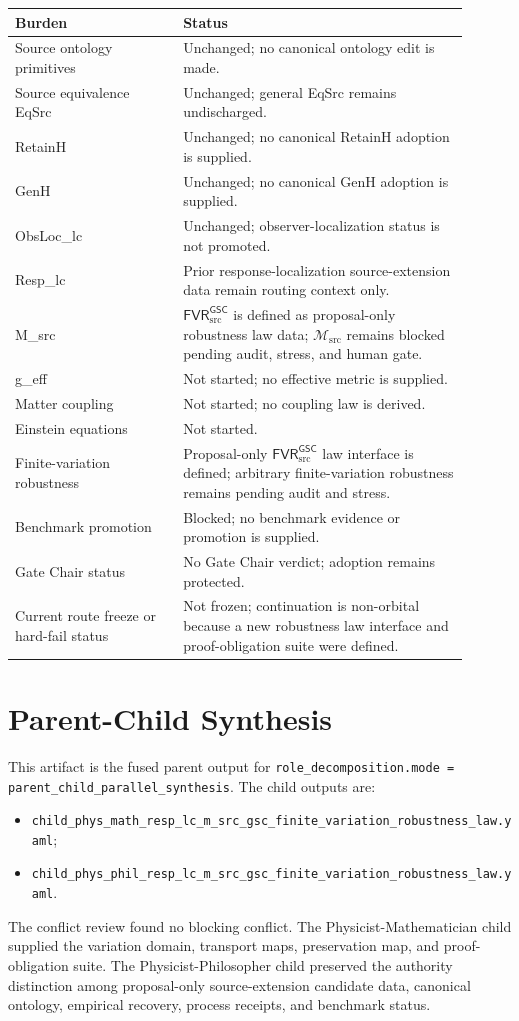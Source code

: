 \documentclass[11pt]{article}
\newcommand{\Msrc}{\mathcal{M}_{\mathrm{src}}}
\newcommand{\FVR}{\mathsf{FVR}_{\mathrm{src}}^{\mathsf{GSC}}}
\begin{document}
\begin{center}
\begin{tabular}{p{0.33\linewidth}p{0.57\linewidth}}
\hline
Burden & Status \\
\hline
Source ontology primitives & Unchanged; no canonical ontology edit is made. \\
Source equivalence EqSrc & Unchanged; general EqSrc remains undischarged. \\
RetainH & Unchanged; no canonical RetainH adoption is supplied. \\
GenH & Unchanged; no canonical GenH adoption is supplied. \\
ObsLoc\_lc & Unchanged; observer-localization status is not promoted. \\
Resp\_lc & Prior response-localization source-extension data remain routing context only. \\
M\_src & \(\FVR\) is defined as proposal-only robustness law data; \(\Msrc\) remains blocked pending audit, stress, and human gate. \\
g\_eff & Not started; no effective metric is supplied. \\
Matter coupling & Not started; no coupling law is derived. \\
Einstein equations & Not started. \\
Finite-variation robustness & Proposal-only \(\FVR\) law interface is defined; arbitrary finite-variation robustness remains pending audit and stress. \\
Benchmark promotion & Blocked; no benchmark evidence or promotion is supplied. \\
Gate Chair status & No Gate Chair verdict; adoption remains protected. \\
Current route freeze or hard-fail status & Not frozen; continuation is non-orbital because a new robustness law interface and proof-obligation suite were defined. \\
\hline
\end{tabular}
\end{center}

\section{Parent-Child Synthesis}

This artifact is the fused parent output for
\texttt{role\_decomposition.mode = parent\_child\_parallel\_synthesis}. The
child outputs are:
\begin{itemize}
  \item \texttt{child\_phys\_math\_resp\_lc\_m\_src\_gsc\_finite\_variation\_robustness\_law.yaml};
  \item \texttt{child\_phys\_phil\_resp\_lc\_m\_src\_gsc\_finite\_variation\_robustness\_law.yaml}.
\end{itemize}
The conflict review found no blocking conflict. The Physicist-Mathematician
child supplied the variation domain, transport maps, preservation map, and
proof-obligation suite. The Physicist-Philosopher child preserved the
authority distinction among proposal-only source-extension candidate data,
canonical ontology, empirical recovery, process receipts, and benchmark
status.
\end{document}
